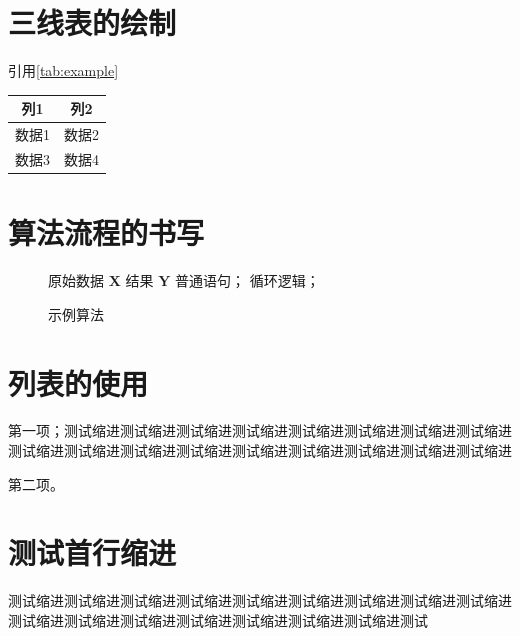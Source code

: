 \section{三线表的绘制}

引用\autoref{tab:example}

\begin{table}[h]
    \label{tab:example}
    \centering
    \vspace{-0.2cm}
    \wuhao\yingsong
    \begin{tabular}{cc}
        \hline
        列1 & 列2  \\
        \hline
        数据1 & 数据2 \\
        数据3 & 数据4 \\
        \hline
    \end{tabular}
\end{table}

\section{算法流程的书写}

\begin{figure}
    \centering
    \begin{minipage}{0.75\linewidth}
        \begin{algorithm}[H]
            \caption{示例算法}
            \label{alg-1}
            \begin{algorithmic}[1]
                \Require 原始数据 $\mathbf{X}$
                \Ensure 结果 $\mathbf{Y}$
                \State 普通语句；
                    \State 循环逻辑；
                \EndFor
            \end{algorithmic}
        \end{algorithm}
    \end{minipage}
\end{figure}

\section{列表的使用}

\begin{asparaenum}[（1）]
    \item 第一项；测试缩进测试缩进测试缩进测试缩进测试缩进测试缩进测试缩进测试缩进测试缩进测试缩进测试缩进测试缩进测试缩进测试缩进测试缩进测试缩进测试缩进
    \item 第二项。
\end{asparaenum}

\section{测试首行缩进}

测试缩进测试缩进测试缩进测试缩进测试缩进测试缩进测试缩进测试缩进测试缩进测试缩进测试缩进测试缩进测试缩进测试缩进测试缩进测试缩进测试


\let\cleardoublepage\clearpage



